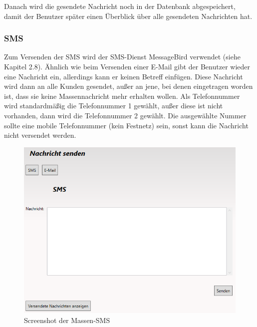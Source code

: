 \medskip
Danach wird die gesendete Nachricht noch in der Datenbank abgespeichert, damit der Benutzer später einen Überblick über alle gesendeten Nachrichten hat. \newline
\subsubsection{SMS}
Zum Versenden der SMS wird der SMS-Dienst MessageBird verwendet (siehe Kapitel 2.8). Ähnlich wie beim Versenden einer E-Mail gibt der Benutzer wieder eine Nachricht ein, allerdings kann er keinen Betreff einfügen.
\noindent \newline Diese Nachricht wird dann an alle Kunden gesendet, außer an jene, bei denen eingetragen worden ist, dass sie keine Massennachricht mehr erhalten wollen. \newline Als Telefonnummer wird standardmäßig die Telefonnummer 1 gewählt, außer diese ist nicht vorhanden, dann wird die Telefonnummer 2 gewählt. Die ausgewählte Nummer sollte eine mobile Telefonnummer (kein Festnetz) sein, sonst kann die Nachricht nicht versendet werden.
\begin{figure}[H]
\begin{center}
	\includegraphics[scale=.7]{images/Massensms.png}
\end{center}
	\caption{Screenshot der Massen-SMS}
	\label{fig:sample}
\end{figure}
\medskip
